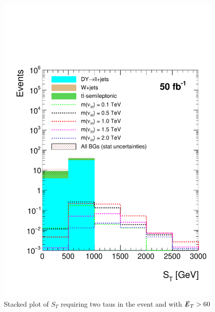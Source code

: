 \begin{figure}[htbp!]
\centering
\includegraphics[width=0.9\linewidth]{StackPlots/ST_2Taus_met60_50ifb_2moreSignals.pdf}
\caption{Stacked plot of $S_{T}$ requiring two taus in the event and with $\slashed{E}_{T} > 60$}
\label{fig: ST2tausMet60}
\end{figure}



